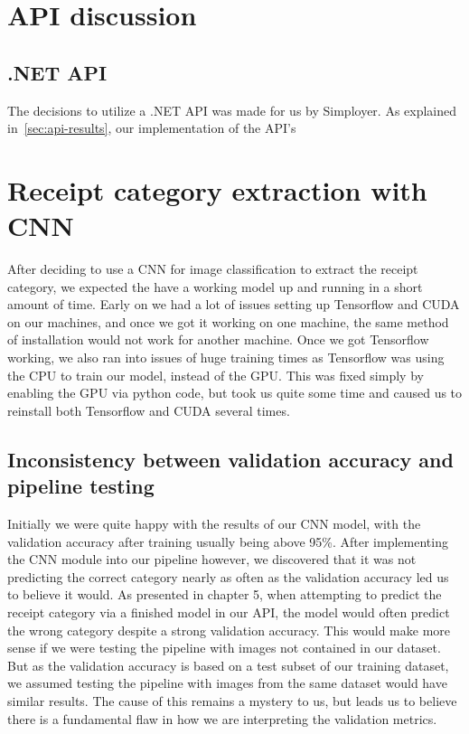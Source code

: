 \section{API discussion}\label{sec:api-discussion}
\subsection{.NET API}\label{subsec:.net-api2}
The decisions to utilize a .NET API was made for us by Simployer.
As explained in~\ref{sec:api-results}, our implementation of the API's

\section{Receipt category extraction with CNN}\label{sec:receipt-category-extraction-with-cnn}
After deciding to use a CNN for image classification to extract the receipt category, we expected the have a working model up and running in a short amount of time.
Early on we had a lot of issues setting up Tensorflow and CUDA on our machines, and once we got it working on one machine, the same method of installation would not work for another machine.
Once we got Tensorflow working, we also ran into issues of huge training times as Tensorflow was using the CPU to train our model, instead of the GPU.
This was fixed simply by enabling the GPU via python code, but took us quite some time and caused us to reinstall both Tensorflow and CUDA several times.

\subsection{Inconsistency between validation accuracy and pipeline testing}\label{subsec:inconsistency-between-validation-accuracy-and-pipeline-testing}
Initially we were quite happy with the results of our CNN model, with the validation accuracy after training usually being above 95\%.
After implementing the CNN module into our pipeline however, we discovered that it was not predicting the correct category nearly as often as the validation accuracy led us to believe it would.
As presented in chapter 5, when attempting to predict the receipt category via a finished model in our API, the model would often predict the wrong category despite a strong validation accuracy.
This would make more sense if we were testing the pipeline with images not contained in our dataset.
But as the validation accuracy is based on a test subset of our training dataset, we assumed testing the pipeline with images from the same dataset would have similar results.
The cause of this remains a mystery to us, but leads us to believe there is a fundamental flaw in how we are interpreting the validation metrics.


